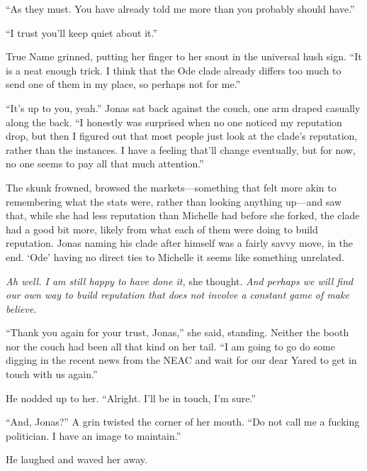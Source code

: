 ``As they must. You have already told me more than you probably should have.''

``I trust you'll keep quiet about it.''

True Name grinned, putting her finger to her snout in the universal hush sign. ``It is a neat enough trick. I think that the Ode clade already differs too much to send one of them in my place, so perhaps not for me.''

``It's up to you, yeah.'' Jonas sat back against the couch, one arm draped casually along the back. ``I honestly was surprised when no one noticed my reputation drop, but then I figured out that most people just look at the clade's reputation, rather than the instances. I have a feeling that'll change eventually, but for now, no one seems to pay all that much attention.''

The skunk frowned, browsed the markets---something that felt more akin to remembering what the stats were, rather than looking anything up---and saw that, while she had less reputation than Michelle had before she forked, the clade had a good bit more, likely from what each of them were doing to build reputation. Jonas naming his clade after himself was a fairly savvy move, in the end. `Ode' having no direct ties to Michelle it seems like something unrelated.

\emph{Ah well. I am still happy to have done it,} she thought. \emph{And perhaps we will find our own way to build reputation that does not involve a constant game of make believe.}

``Thank you again for your trust, Jonas,'' she said, standing. Neither the booth nor the couch had been all that kind on her tail. ``I am going to go do some digging in the recent news from the NEAC and wait for our dear Yared to get in touch with us again.''

He nodded up to her. ``Alright. I'll be in touch, I'm sure.''

``And, Jonas?'' A grin twisted the corner of her mouth. ``Do not call me a fucking politician. I have an image to maintain.''

He laughed and waved her away.
